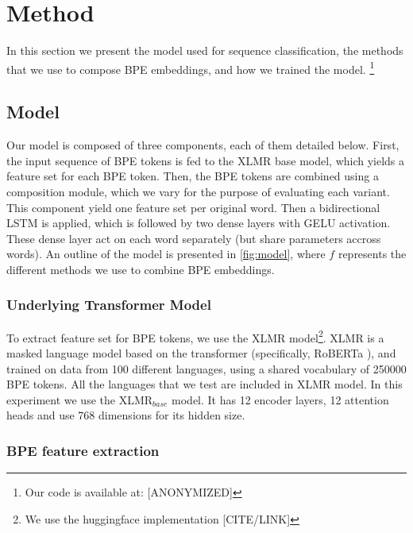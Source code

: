 \documentclass[11pt]{article}
\begin{document}
	\section{Method}
	\label{method}
    	In this section we present the model used for sequence
     classification, the methods that we use to compose BPE
     embeddings, and how we trained the model. \footnote{Our code is
     available at: [ANONYMIZED]}

	\subsection{Model}

        Our model is composed of three components, each of them
        detailed below. First, the input sequence of BPE tokens is fed
        to the XLMR base model, which yields a feature set for each
        BPE token. Then, the BPE tokens are combined using a
        composition module, which we vary for the purpose of
        evaluating each variant. This component yield one feature set
        per original word. Then a bidirectional LSTM is applied, which
        is followed by two dense layers with GELU
        activation. These dense layer act on each word separately (but
        share parameters accross words).  An outline of the model is
        presented in \cref{fig:model}, where $f$ represents the
        different methods we use to combine BPE embeddings.

	\subsubsection{Underlying Transformer Model}
            	To extract feature set for BPE tokens, we use the XLMR
     \cite{conneau2019unsupervised} model\footnote{We use the
     huggingface implementation [CITE/LINK]}. XLMR is a masked
     language model based on the transformer (specifically, RoBERTa
     \cite{liu2019roberta}), and trained on data from 100 different
     languages, using a shared vocabulary of 250000 BPE tokens. All
     the languages that we test are included in XLMR model. In this
     experiment we use the \textsc{XLMR}$_{base}$ model. It has 12
     encoder layers, 12 attention heads and use 768 dimensions for its
     hidden size.
	

	\subsubsection{BPE feature extraction}
        \label{sec:bpe-features}
\end{document}
